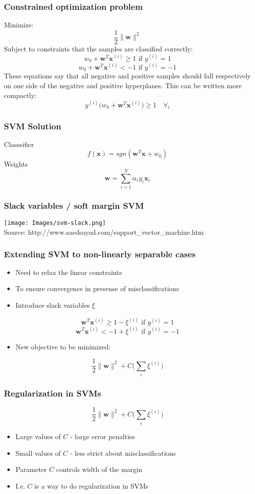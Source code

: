 \documentclass{beamer}
\begin{document}
\begin{frame}
  \frametitle{Constrained optimization problem}
  Minimize:
  \[
  \frac{1}{2} \lVert \mathbf{w} \rVert^2
  \]
  Subject to constraints that the samples are classified correctly:
  \[
  w_0 + \mathbf{w}^T \mathbf{x}^{(i)} \ge 1 \text{ if } y^{(i)} = 1
  \]
  \[
  w_0 + \mathbf{w}^T \mathbf{x}^{(i)}  < -1 \text{ if } y^{(i)} = -1
  \]
  These equations say that all negative and positive samples should fall respectively on one side of the negative and positive hyperplanes. This can be written more compactly:
  \[
  y^{(i)} \big(  w_0 + \mathbf{w}^T \mathbf{x}^{(i)} \big) \ge 1 \quad \forall_i
  \]
\end{frame}

\begin{frame}
  \frametitle{SVM Solution}
  Classsifier
  \[
  f(\mathbf{x}) = sgn(\mathbf{w}^T \mathbf{x} + w_0)
  \]
  Weights
  \[
  \mathbf{w} = \sum_{i=1}^N \alpha_i y_i \mathbf{x}_i
  \]
\end{frame}

\begin{frame}
  \frametitle{Slack variables / soft margin SVM}
  \texttt{[image: Images/svm-slack.png]}
  \\
  \tiny{Source: http://www.saedsayad.com/support\_vector\_machine.htm}
\end{frame}


\begin{frame}
  \frametitle{Extending SVM to non-linearly separable cases}
  \begin{itemize}
  \item Need to relax the linear constraints
  \item To ensure convergence in presense of misclassifications
  \item Introduce slack variables $\xi$
  \end{itemize}
  \[
  \mathbf{w}^T \mathbf{x}^{(i)} \ge 1 - \xi^{(i)} \text{ if } y^{(i)} = 1
  \]
  \[
  \mathbf{w}^T \mathbf{x}^{(i)} < -1 + \xi^{(i)} \text{ if } y^{(i)} = -1
  \]
  \begin{itemize}
  \item New objective to be minimized:
  \end{itemize}
  \[
  \frac{1}{2} \lVert \mathbf{w} \rVert^2 + C \Big(\sum_i \xi^{(i)} \Big)
  \]
\end{frame}

\begin{frame}
  \frametitle{Regularization in SVMs}
  \[
  \frac{1}{2} \lVert \mathbf{w} \rVert^2 + C \Big(\sum_i \xi^{(i)} \Big)
  \]
  \begin{itemize}
  \item Large values of $C$ - large error penalties
  \item Small values of $C$ - less strict about misclassifications
  \item Parameter $C$ controls width of the margin
  \item I.e. $C$ is a way to do regularization in SVMs
  \end{itemize}
\end{frame}
\end{document}

